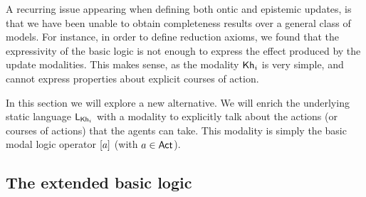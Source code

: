 A recurring issue appearing when defining both ontic and epistemic updates, is that we have been unable to obtain completeness results over a general class of models. For instance, in order to define reduction axioms, we found that the expressivity of the basic logic is not enough to express the effect produced by the update modalities. This makes sense, as the modality ${\sf Kh}_i$ is very simple, and cannot express properties about explicit courses of action. 



In this section we will explore a new alternative. We will enrich the underlying static language $\mathsf{L}_{{\sf Kh}_i}$ with a modality to explicitly talk about the actions (or courses of actions) that the agents can take. This modality is simply the basic modal logic operator $[a]$ (with $a\in{\rm \sf Act}$). 

\subsection{The extended basic logic}

